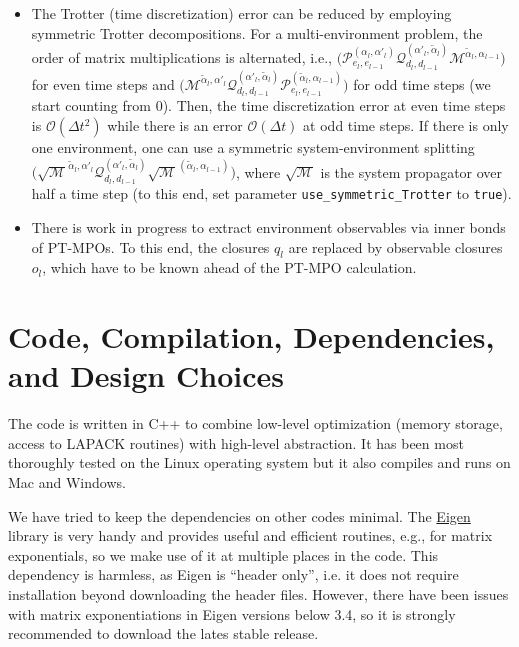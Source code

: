 \documentclass{scrartcl}
\begin{document}
\begin{itemize}
\item The Trotter (time discretization) error can be reduced by employing 
symmetric Trotter decompositions. For a multi-environment problem, the order 
of matrix multiplications is alternated, i.e., 
$\big( \mathcal{P}^{(\alpha_l,\alpha'_l)}_{e_l,e_{l-1}}
\mathcal{Q}^{(\alpha'_l, \tilde{\alpha}_l)}_{d_l,d_{l-1}} 
\mathcal{M}^{\tilde{\alpha}_l,\alpha_{l-1}}\big)$ 
for even time steps and
$\big(\mathcal{M}^{\tilde{\alpha}_l,\alpha'_{l}}
\mathcal{Q}^{(\alpha'_l, \tilde{\alpha}_l)}_{d_l,d_{l-1}}
\mathcal{P}^{(\tilde{\alpha}_l,\alpha_{l-1})}_{e_l,e_{l-1}}\big)$
for odd time steps (we start counting from 0). Then, the time discretization 
error at even time steps is $\mathcal{O}(\Delta t^2)$ while there is an error
$\mathcal{O}(\Delta t)$ at odd time steps. 
If there is only one environment, one can use a symmetric
system-environment splitting 
$\big(\sqrt{\mathcal{M}}^{\tilde{\alpha}_l,\alpha'_{l}}
\mathcal{Q}^{(\alpha'_l, \tilde{\alpha}_l)}_{d_l,d_{l-1}}
\sqrt{\mathcal{M}}^{(\tilde{\alpha}_l,\alpha_{l-1})}\big)$,
where $\sqrt{\mathcal{M}}$ is the system propagator over half a time step
(to this end, set parameter \verb#use_symmetric_Trotter# to \verb#true#).

\item There is work in progress to extract environment observables 
via inner bonds of PT-MPOs. To this end, the closures $q_l$ are replaced by
observable closures $o_l$, which have to be known ahead of the PT-MPO 
calculation.
\end{itemize}

\section{Code, Compilation, Dependencies, and Design Choices}
The code is written in C++ to combine low-level optimization 
(memory storage, access to LAPACK routines) with high-level abstraction.
It has been most thoroughly tested on the Linux
operating system but it also compiles and runs on Mac and Windows.

We have tried to keep the dependencies on other codes minimal.
The \href{http://eigen.tuxfamily.org}{Eigen} library is very handy
and provides useful and efficient routines, e.g., for matrix exponentials,
so we make use of it at multiple places in the code. This dependency is 
harmless, as Eigen is ``header only'', i.e. it does not require installation
beyond downloading the header files. However, there have been issues with 
matrix exponentiations in Eigen versions below 3.4, so it is strongly 
recommended to download the lates stable release.
\end{document}
